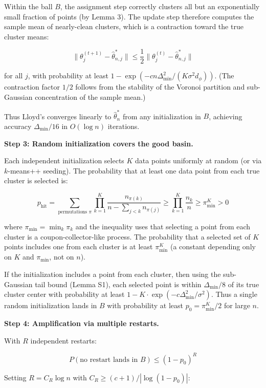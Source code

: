 \documentclass[
  12pt,
]{article}
\begin{document}
Within the ball \(B\), the assignment step correctly clusters all but an
exponentially small fraction of points (by Lemma 3). The update step
therefore computes the sample mean of nearly-clean clusters, which is a
contraction toward the true cluster means:

\[\|\theta_j^{(t+1)} - \hat{\theta}_{n,j}^*\| \leq \frac{1}{2} \|\theta_j^{(t)} - \hat{\theta}_{n,j}^*\|\]

for all \(j\), with probability at least
\(1 - \exp(-c n \Delta_{\min}^2 / (K \sigma^2 d_\phi))\). (The
contraction factor \(1/2\) follows from the stability of the Voronoi
partition and sub-Gaussian concentration of the sample mean.)

Thus Lloyd's converges linearly to \(\hat{\theta}_n^*\) from any
initialization in \(B\), achieving accuracy \(\Delta_{\min}/16\) in
\(O(\log n)\) iterations.

\textbf{Step 3: Random initialization covers the good basin.}

Each independent initialization selects \(K\) data points uniformly at
random (or via \(k\)-means++ seeding). The probability that at least one
data point from each true cluster is selected is:

\[p_{\text{hit}} = \sum_{\text{permutations } \pi} \prod_{k=1}^K \frac{n_{\pi(k)}}{n - \sum_{j<k} n_{\pi(j)}} \geq \prod_{k=1}^K \frac{n_k}{n} \geq \pi_{\min}^K > 0\]

where \(\pi_{\min} = \min_k \pi_k\) and the inequality uses that
selecting a point from each cluster is a coupon-collector-like process.
The probability that a selected set of \(K\) points includes one from
each cluster is at least \(\pi_{\min}^K\) (a constant depending only on
\(K\) and \(\pi_{\min}\), not on \(n\)).

If the initialization includes a point from each cluster, then using the
sub-Gaussian tail bound (Lemma S1), each selected point is within
\(\Delta_{\min}/8\) of its true cluster center with probability at least
\(1 - K \cdot \exp(-c \Delta_{\min}^2/\sigma^2)\). Thus a single random
initialization lands in \(B\) with probability at least
\(p_0 = \pi_{\min}^K / 2\) for large \(n\).

\textbf{Step 4: Amplification via multiple restarts.}

With \(R\) independent restarts:

\[P(\text{no restart lands in } B) \leq (1 - p_0)^R\]

Setting \(R = C_R \log n\) with \(C_R \geq (c+1)/|\log(1-p_0)|\):
\end{document}
